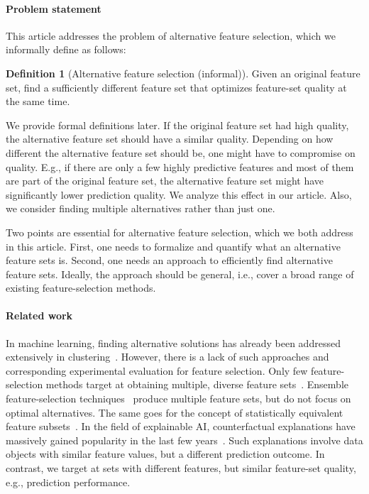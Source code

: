 \documentclass[conference]{IEEEtran}
\theoremstyle{definition}
\newtheorem{definition}{Definition}
\begin{document}
\paragraph{Problem statement}

This article addresses the problem of alternative feature selection, which we informally define as follows:
%
\begin{definition}[Alternative feature selection (informal)]
	Given an original feature set, find a sufficiently different feature set that optimizes feature-set quality at the same time.
	\label{def:alternative-feature-selection}
\end{definition}
%
We provide formal definitions later.
If the original feature set had high quality, the alternative feature set should have a similar quality.
Depending on how different the alternative feature set should be, one might have to compromise on quality.
E.g., if there are only a few highly predictive features and most of them are part of the original feature set, the alternative feature set might have significantly lower prediction quality.
We analyze this effect in our article.
Also, we consider finding multiple alternatives rather than just one.

Two points are essential for alternative feature selection, which we both address in this article.
First, one needs to formalize and quantify what an alternative feature sets is.
Second, one needs an approach to efficiently find alternative feature sets.
Ideally, the approach should be general, i.e., cover a broad range of existing feature-selection methods.

\paragraph{Related work}

In machine learning, finding alternative solutions has already been addressed extensively in clustering~\cite{bailey2014alternative}.
However, there is a lack of such approaches and corresponding experimental evaluation for feature selection.
Only few feature-selection methods target at obtaining multiple, diverse feature sets~\cite{borboudakis2021extending, siddiqi2020genetic}.
Ensemble feature-selection techniques~\cite{saeys2008robust, seijo2017ensemble} produce multiple feature sets, but do not focus on optimal alternatives.
The same goes for the concept of statistically equivalent feature subsets~\cite{lagani2017feature}.
In the field of explainable AI, counterfactual explanations have massively gained popularity in the last few years~\cite{verma2020counterfactual, stepin2021survey}.
Such explanations involve data objects with similar feature values, but a different prediction outcome.
In contrast, we target at sets with different features, but similar feature-set quality, e.g., prediction performance.
\end{document}
